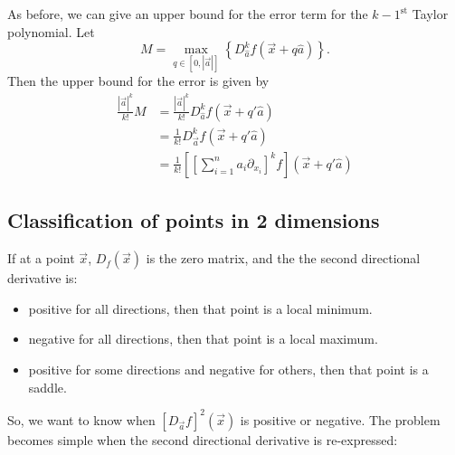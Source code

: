 \documentclass{article}
\theoremstyle{definition}
\begin{document}
As before, we can give an upper bound for the error term for the $k-1^\text{st}$ Taylor polynomial. Let \[M=\max_{q\in[0,|\vec a|]}\left\{D_{\hat a}^kf(\vec x+q\hat a)\right\}.\] Then the upper bound for the error is given by
\begin{align*}
	\frac{|\vec a|^k}{k!}M&=\frac{|\vec a|^k}{k!}D_{\hat a}^kf(\vec x+q'\hat a)\\
	&=\frac{1}{k!}D_{\vec a}^kf(\vec x+q'\hat a)\\
	&=\frac{1}{k!}\left[\left[\sum_{i=1}^na_i\partial_{x_i}\right]^kf\right](\vec x+q'\hat a)
\end{align*}









\newpage
\subsection{Classification of points in 2 dimensions}
If at a point $\vec x$, $D_f(\vec x)$ is the zero matrix, and the the second directional derivative is:
\begin{itemize}
	\item positive for all directions, then that point is a local minimum.
	\item negative for all directions, then that point is a local maximum.
	\item positive for some directions and negative for others, then that point is a saddle.
\end{itemize}
So, we want to know when $\left[D_{\vec a}f\right]^2(\vec x)$ is positive or negative. The problem becomes simple when the second directional derivative is re-expressed:
\end{document}

